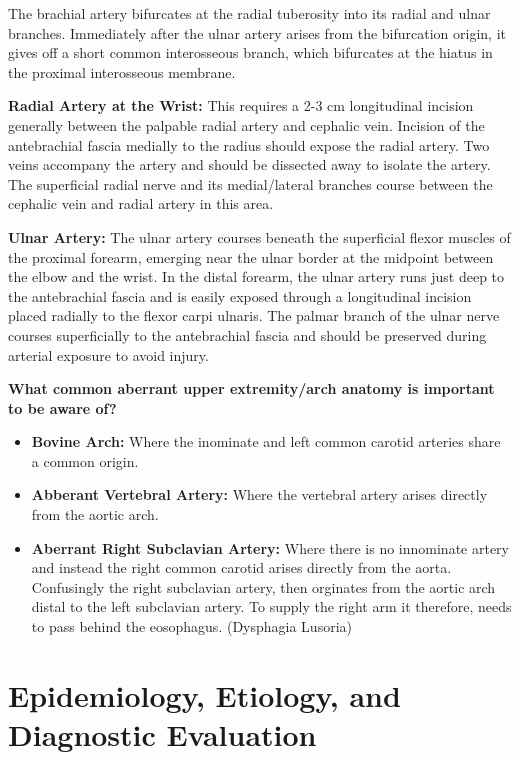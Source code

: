 \documentclass[
]{book}
\begin{document}
The brachial artery bifurcates at the radial tuberosity into its radial
and ulnar branches. Immediately after the ulnar artery arises from the
bifurcation origin, it gives off a short common interosseous branch,
which bifurcates at the hiatus in the proximal interosseous membrane.

\textbf{Radial Artery at the Wrist:} This requires a 2-3 cm longitudinal
incision generally between the palpable radial artery and cephalic vein.
Incision of the antebrachial fascia medially to the radius should expose
the radial artery. Two veins accompany the artery and should be
dissected away to isolate the artery. The superficial radial nerve and
its medial/lateral branches course between the cephalic vein and radial
artery in this area.

\textbf{Ulnar Artery:} The ulnar artery courses beneath the superficial
flexor muscles of the proximal forearm, emerging near the ulnar border
at the midpoint between the elbow and the wrist. In the distal forearm,
the ulnar artery runs just deep to the antebrachial fascia and is easily
exposed through a longitudinal incision placed radially to the flexor
carpi ulnaris. The palmar branch of the ulnar nerve courses
superficially to the antebrachial fascia and should be preserved during
arterial exposure to avoid injury.

\textbf{What common aberrant upper extremity/arch anatomy is important to be
aware of?}

\begin{itemize}
\item
  \textbf{Bovine Arch:} Where the inominate and left common carotid
  arteries share a common origin.
\item
  \textbf{Abberant Vertebral Artery:} Where the vertebral artery arises
  directly from the aortic arch.
\item
  \textbf{Aberrant Right Subclavian Artery:} Where there is no innominate
  artery and instead the right common carotid arises directly from the
  aorta. Confusingly the right subclavian artery, then orginates from
  the aortic arch distal to the left subclavian artery. To supply the
  right arm it therefore, needs to pass behind the eosophagus.
  (Dysphagia Lusoria)
\end{itemize}

\hypertarget{epidemiology-etiology-and-diagnostic-evaluation}{%
\section{Epidemiology, Etiology, and Diagnostic Evaluation}\label{epidemiology-etiology-and-diagnostic-evaluation}}
\end{document}
